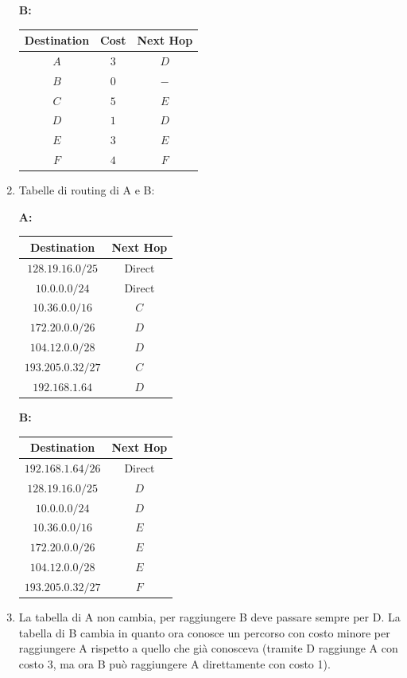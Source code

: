 \documentclass[10pt]{article}
\begin{document}
\begin{enumerate}
\begin{center}
						\textbf{B:}
						\begin{tabular}{||c || c || c||}
							\hline
							Destination & Cost & Next Hop \\[0.5ex] 
							\hline\hline
							$A$ & $3$ & $D$ \\
							$B$ & $0$ & $-$ \\
							$C$ & $5$ & $E$ \\
							$D$ & $1$ & $D$ \\
							$E$ & $3$ & $E$ \\
							$F$ & $4$ & $F$ \\[0.5ex] 
							\hline
						\end{tabular}
					\end{center}
				\item Tabelle di routing di A e B:
					\begin{center}
						\textbf{A:}
						\begin{tabular}{||c || c||}
							\hline
							Destination & Next Hop \\[0.5ex] 
							\hline\hline
							$128.19.16.0/25$ & Direct \\
							$10.0.0.0/24$ & Direct \\
							$10.36.0.0/16$ & $C$ \\
							$172.20.0.0/26$ & $D$ \\
							$104.12.0.0/28$ & $D$ \\
							$193.205.0.32/27$ & $C$ \\
							$192.168.1.64$& $D$ \\[0.5ex] 
							\hline
						\end{tabular}
						\textbf{B:}
						\begin{tabular}{||c || c||}
							\hline
							Destination & Next Hop \\[0.5ex] 
							\hline\hline
							$192.168.1.64/26$ & Direct \\
							$128.19.16.0/25$ & $D$ \\
							$10.0.0.0/24$ & $D$ \\
							$10.36.0.0/16$ & $E$ \\
							$172.20.0.0/26$ & $E$ \\
							$104.12.0.0/28$ & $E$ \\
							$193.205.0.32/27$ & $F$ \\[0.5ex] 
							\hline
						\end{tabular}
					\end{center}
				\item La tabella di A non cambia, per raggiungere B deve passare sempre per D. La tabella di B cambia in quanto ora conosce un percorso con costo minore per raggiungere A rispetto a quello che già conosceva (tramite D raggiunge A con costo 3, ma ora B può raggiungere A direttamente con costo 1).
			\end{enumerate}
\end{document}
